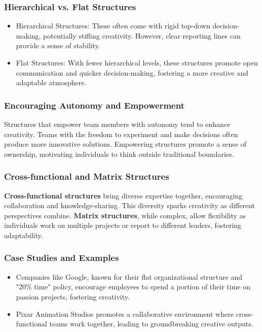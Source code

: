 \documentclass[a4paper, twoside]{article}
\begin{document}
\subsubsection{Hierarchical vs. Flat Structures}
\begin{itemize}
    \item{Hierarchical Structures:} These often come with rigid top-down decision-making, potentially stifling creativity. However, clear reporting lines can provide a sense of stability.
    \item{Flat Structures:} With fewer hierarchical levels, these structures promote open communication and quicker decision-making, fostering a more creative and adaptable atmosphere.
\end{itemize}




\subsubsection{Encouraging Autonomy and Empowerment}

Structures that empower team members with autonomy tend to enhance creativity. Teams with the freedom to experiment and make decisions often produce more innovative solutions. Empowering structures promote a sense of ownership, motivating individuals to think outside traditional boundaries.

\subsubsection{Cross-functional and Matrix Structures}

\textbf{Cross-functional structures} bring diverse expertise together, encouraging collaboration and knowledge-sharing. This diversity sparks creativity as different perspectives combine.\newline
\newline
\textbf{Matrix structures}, while complex, allow flexibility as individuals work on multiple projects or report to different leaders, fostering adaptability.

\subsubsection{Case Studies and Examples}
\begin{itemize}
    \item   Companies like Google, known for their flat organizational structure and "20\% time" policy, encourage employees to spend a portion of their time on passion projects, fostering creativity.
    \item   Pixar Animation Studios promotes a collaborative environment where cross-functional teams work together, leading to groundbreaking creative outputs.
\end{itemize}
\end{document}
